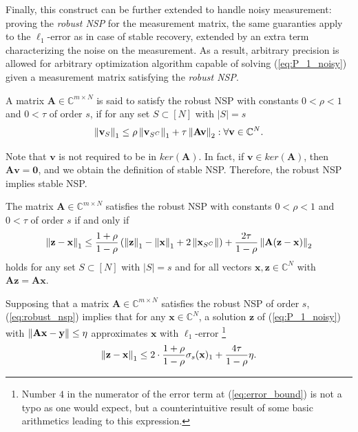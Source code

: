 Finally, this construct can be further extended  to handle noisy measurement: proving the \textit{robust NSP} for the measurement matrix, the same guaranties apply to the $\ell_1$-error as in case of stable recovery, extended by an extra term characterizing the noise on the measurement. As a result, arbitrary precision is allowed for arbitrary optimization algorithm capable of solving (\ref{eq:P_1_noisy}) given a measurement matrix satisfying the \textit{robust NSP}.

\begin{definition}
A matrix $\mathbf{A} \in \mathbb{C}^{m \times N}$ is said to satisfy the robust NSP with constants $0 < \rho < 1$ and $0 < \tau$ of order $s$, if for any set $S \subset [N]$ with $|S| = s$
\[\left\lVert\mathbf{v}_S\right\rVert_1 \le \rho \left\lVert\mathbf{v}_{S^C}\right\rVert_1 + \tau \left\lVert\mathbf{Av}\right\rVert_2 : \forall \mathbf{v} \in \mathbb{C}^N.\]
\end{definition}

\begin{remark}
Note that $\mathbf{v}$ is not required to be in $ker(\mathbf{A})$.  In fact, if $\mathbf{v} \in ker(\mathbf{A})$, then $\mathbf{Av} = \mathbf{0}$, and we obtain the definition of stable NSP. Therefore, the robust NSP implies stable NSP.
\end{remark}

\begin{theorem}
The matrix $\mathbf{A} \in \mathbb{C}^{m \times N}$ satisfies the robust NSP with constants $0 < \rho < 1$ and $0 < \tau$ of order $s$ if and only if
\begin{equation}\label{eq:robust_nsp}
    \left\lVert\mathbf{z} - \mathbf{x}\right\rVert_1 \le \frac{1 + \rho}{1 - \rho} \left(\left\lVert\mathbf{z}\right\rVert_1 - \left\lVert\mathbf{x}\right\rVert_1 + 2\left\lVert\mathbf{x}_{S^C}\right\rVert\right) + \frac{2\tau}{1-\rho}\left\lVert\mathbf{A(z-x)}\right\rVert_2
\end{equation}
holds for any set $S \subset [N]$ with $|S| = s$ and for all vectors $\mathbf{x,z} \in \mathbb{C}^N$ with $\mathbf{Az} = \mathbf{Ax}$.
\end{theorem}

\begin{remark}
Supposing that a matrix $\mathbf{A} \in \mathbb{C}^{m \times N}$ satisfies the robust NSP of order $s$, (\ref{eq:robust_nsp}) implies that for any $\mathbf{x} \in \mathbb{C}^N$, a solution $\mathbf{z}$ of (\ref{eq:P_1_noisy}) with $\left\lVert\mathbf{Ax - y}\right\rVert \le \eta$ approximates $\mathbf{x}$ with $\ell_1$-error \footnote{Number $4$ in the numerator of the error term at (\ref{eq:error_bound}) is not a typo as one would expect, but a counterintuitive result of some basic arithmetics leading to this expression.}
\begin{equation}\label{eq:error_bound}
    \left\lVert\mathbf{z} - \mathbf{x}\right\rVert_1 \le 2 \cdot \frac{1 + \rho}{1 - \rho}\sigma_s(\mathbf{x})_1 + \frac{4\tau}{1-\rho}\eta.
\end{equation}
\end{remark}

